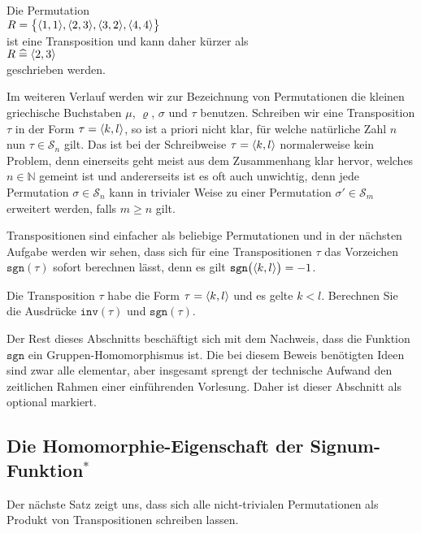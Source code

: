\example
Die Permutation 
\\[0.2cm]
\hspace*{1.3cm}
$R = \bigl\{ \pair(1,1), \pair(2,3), \pair(3,2), \pair(4,4) \bigr\}$
\\[0.2cm]
ist eine Transposition und kann daher k\"urzer als
\\[0.2cm]
\hspace*{1.3cm}
$R \;\widehat{=}\; \pair(2,3)$
\\[0.2cm]
geschrieben werden. \eox

\remark
Im weiteren Verlauf werden wir zur Bezeichnung von Permutationen die kleinen griechische Buchstaben
$\mu$, $\varrho$, $\sigma$ und $\tau$ benutzen.
Schreiben wir eine Transposition $\tau$ in der Form $\tau = \pair(k,l)$, so ist a priori nicht
klar, f\"ur welche nat\"urliche Zahl $n$ nun $\tau \in \mathcal{S}_n$ gilt.  Das ist bei der
Schreibweise $\tau = \pair(k,l)$ normalerweise kein Problem, denn einerseits geht meist aus dem Zusammenhang
klar hervor, welches $n \in  \mathbb{N}$ gemeint ist und andererseits ist es oft auch 
unwichtig, denn jede Permutation $\sigma \in \mathcal{S}_n$ kann in trivialer Weise zu einer Permutation
$\sigma'\in \mathcal{S}_m$ erweitert werden, falls $m \geq n$ gilt. \eox

Transpositionen sind einfacher als beliebige Permutationen und in der n\"achsten Aufgabe werden wir
sehen, dass sich  f\"ur eine Transpositionen $\tau$ das Vorzeichen $\mathtt{sgn}(\tau)$ sofort berechnen l\"asst, denn es gilt
$\mathtt{sgn}\bigl(\pair(k,l)\bigr) = -1$.

\exercise
Die Transposition $\tau$ habe die Form  $\tau = \pair(k,l)$ 
und es gelte $k < l$.  Berechnen Sie die Ausdr\"ucke $\mathtt{inv}(\tau)$ und $\mathtt{sgn}(\tau)$.
\eox


Der Rest dieses Abschnitts besch\"aftigt sich mit dem Nachweis, dass die Funktion $\mathtt{sgn}$ ein
Gruppen-Homomorphismus ist.  Die bei diesem Beweis ben\"otigten Ideen sind zwar alle elementar, aber
insgesamt sprengt der technische Aufwand den zeitlichen Rahmen einer einf\"uhrenden Vorlesung.  Daher
ist dieser Abschnitt als optional markiert. 

\subsection{Die Homomorphie-Eigenschaft der Signum-Funktion$^*$}
Der n\"achste Satz zeigt uns, dass
sich alle nicht-trivialen Permutationen als Produkt von Transpositionen schreiben lassen.  

